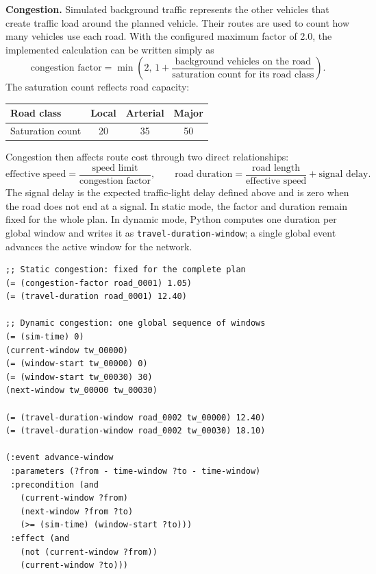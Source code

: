 \documentclass[10pt]{article}
\begin{document}
\textbf{Congestion.} Simulated background traffic represents the other
vehicles that create traffic load around the planned vehicle. Their routes are
used to count how many vehicles use each road. With the configured maximum
factor of 2.0, the implemented calculation can be written simply as
\[
 \text{congestion factor}
 =\min\!\left(2,\,1+\frac{\text{background vehicles on the road}}
                         {\text{saturation count for its road class}}\right).
\]
The saturation count reflects road capacity:

\begin{center}
\scriptsize
\begin{tabular}{@{}lccc@{}}
\toprule
Road class & Local & Arterial & Major \\
\midrule
Saturation count & 20 & 35 & 50 \\
\bottomrule
\end{tabular}
\end{center}

Congestion then affects route cost through two direct relationships:
\[
 \text{effective speed}=\frac{\text{speed limit}}{\text{congestion factor}},
 \qquad
 \text{road duration}=\frac{\text{road length}}{\text{effective speed}}
                       +\text{signal delay}.
\]
The signal delay is the expected traffic-light delay defined above and is zero
when the road does not end at a signal. In static mode, the factor and duration
remain fixed for the whole plan. In dynamic mode, Python computes one duration
per global window and writes it as \texttt{travel-duration-window}; a single
global event advances the active window for the network.

\begin{lstlisting}
;; Static congestion: fixed for the complete plan
(= (congestion-factor road_0001) 1.05)
(= (travel-duration road_0001) 12.40)

;; Dynamic congestion: one global sequence of windows
(= (sim-time) 0)
(current-window tw_00000)
(= (window-start tw_00000) 0)
(= (window-start tw_00030) 30)
(next-window tw_00000 tw_00030)

(= (travel-duration-window road_0002 tw_00000) 12.40)
(= (travel-duration-window road_0002 tw_00030) 18.10)

(:event advance-window
 :parameters (?from - time-window ?to - time-window)
 :precondition (and
   (current-window ?from)
   (next-window ?from ?to)
   (>= (sim-time) (window-start ?to)))
 :effect (and
   (not (current-window ?from))
   (current-window ?to)))
\end{lstlisting}
\end{document}
